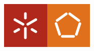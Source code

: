 \begin{titlepage}

\includegraphics[scale=0.7]{img/escola-eng.png}\\[0cm] %


\vfill %

\end{titlepage}

